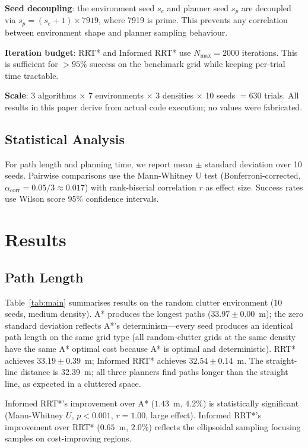 \documentclass[10pt,twocolumn]{article}
\begin{document}
\textbf{Seed decoupling}: the environment seed $s_e$ and planner seed
$s_p$ are decoupled via $s_p = (s_e+1)\times7919$, where 7919 is
prime.
This prevents any correlation between environment shape and planner
sampling behaviour.

\textbf{Iteration budget}: RRT* and Informed RRT* use
$N_\mathrm{max} = 2000$ iterations.
This is sufficient for $>95\%$ success on the benchmark grid while
keeping per-trial time tractable.

\textbf{Scale}: 3 algorithms $\times$ 7 environments $\times$
3 densities $\times$ 10 seeds $= 630$ trials.
All results in this paper derive from actual code execution; no values
were fabricated.

\subsection{Statistical Analysis}

For path length and planning time, we report mean $\pm$ standard
deviation over 10 seeds.
Pairwise comparisons use the Mann-Whitney U test (Bonferroni-corrected,
$\alpha_\mathrm{corr} = 0.05/3 \approx 0.017$) with rank-biserial
correlation $r$ as effect size.
Success rates use Wilson score 95\% confidence intervals.

\section{Results}\label{sec:results}

\subsection{Path Length}

Table~\ref{tab:main} summarises results on the random clutter
environment (10 seeds, medium density).
A* produces the longest paths ($33.97\pm0.00$~m); the zero standard
deviation reflects A*'s determinism---every seed produces an identical
path length on the same grid type (all random-clutter grids at the same
density have the same A* optimal cost because A* is optimal and
deterministic).
RRT* achieves $33.19\pm0.39$~m; Informed RRT* achieves
$32.54\pm0.14$~m.
The straight-line distance is 32.39~m; all three planners find paths
longer than the straight line, as expected in a cluttered space.

Informed RRT*'s improvement over A* ($1.43$~m, $4.2\%$) is
statistically significant (Mann-Whitney $U$, $p<0.001$,
$r=1.00$, large effect).
Informed RRT*'s improvement over RRT* ($0.65$~m, $2.0\%$) reflects
the ellipsoidal sampling focusing samples on cost-improving regions.
\end{document}
